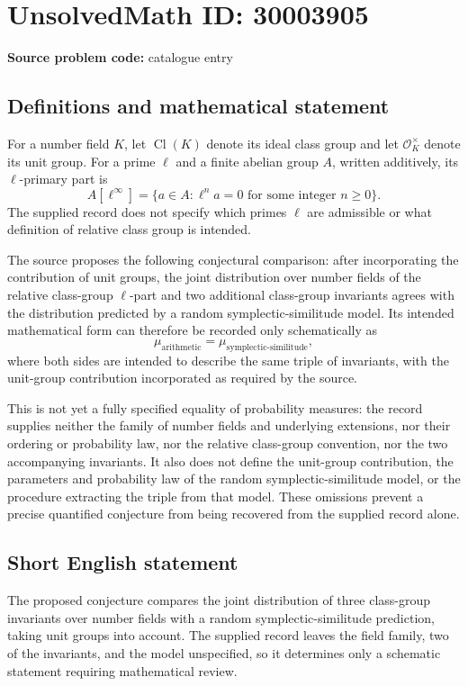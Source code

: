 \documentclass[11pt]{article}
\begin{document}
\section*{UnsolvedMath ID: 30003905}
\textbf{Source problem code:} catalogue entry
\subsection{Definitions and mathematical statement}
For a number field \(K\), let \(\operatorname{Cl}(K)\) denote its ideal class group and let \(\mathcal O_K^{\times}\) denote its unit group. For a prime \(\ell\) and a finite abelian group \(A\), written additively, its \(\ell\)-primary part is
\[
A[\ell^{\infty}]=\{a\in A:\ell^n a=0\text{ for some integer }n\geq 0\}.
\]
The supplied record does not specify which primes \(\ell\) are admissible or what definition of relative class group is intended.

The source proposes the following conjectural comparison: after incorporating the contribution of unit groups, the joint distribution over number fields of the relative class-group \(\ell\)-part and two additional class-group invariants agrees with the distribution predicted by a random symplectic-similitude model. Its intended mathematical form can therefore be recorded only schematically as
\[
\mu_{\mathrm{arithmetic}}=\mu_{\mathrm{symplectic\text{-}similitude}},
\]
where both sides are intended to describe the same triple of invariants, with the unit-group contribution incorporated as required by the source.

This is not yet a fully specified equality of probability measures: the record supplies neither the family of number fields and underlying extensions, nor their ordering or probability law, nor the relative class-group convention, nor the two accompanying invariants. It also does not define the unit-group contribution, the parameters and probability law of the random symplectic-similitude model, or the procedure extracting the triple from that model. These omissions prevent a precise quantified conjecture from being recovered from the supplied record alone.
\subsection{Short English statement}
The proposed conjecture compares the joint distribution of three class-group invariants over number fields with a random symplectic-similitude prediction, taking unit groups into account. The supplied record leaves the field family, two of the invariants, and the model unspecified, so it determines only a schematic statement requiring mathematical review.
\end{document}
